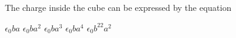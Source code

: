 \documentclass{../../oss-apphys-exam}
\begin{document}
\begin{multicols*}{2}
\begin{questions}
    \question The charge inside the cube can be expressed by the equation
    \label{cube2}
    \begin{choices}
      \choice $\epsilon_0ba$
      \choice $\epsilon_0ba^2$
      \choice $\epsilon_0ba^3$
      \choice $\epsilon_0ba^4$
      \choice $\epsilon_0b^22a^2$
    \end{choices}
%    
%

\end{questions}
\end{multicols*}
\end{document}

